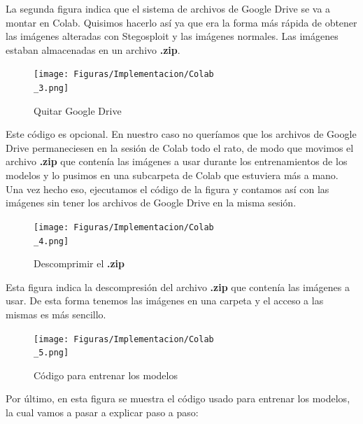 La segunda figura indica que el sistema de archivos de Google Drive se va a montar en Colab. Quisimos hacerlo así ya que era la forma más rápida de obtener las imágenes alteradas con Stegosploit y las imágenes normales. Las imágenes estaban almacenadas en un archivo \textbf{.zip}.

\begin{figure}[H]
  \centering
  \texttt{[image: Figuras/Implementacion/Colab\\\_3.png]}
  \label{fig:colab-3}
  \caption{Quitar Google Drive}
\end{figure}

Este código es opcional. En nuestro caso no queríamos que los archivos de Google Drive permaneciesen en la sesión de Colab todo el rato, de modo que movimos el archivo \textbf{.zip} que contenía las imágenes a usar durante los entrenamientos de los modelos y lo pusimos en una subcarpeta de Colab que estuviera más a mano. Una vez hecho eso, ejecutamos el código de la figura y contamos así con las imágenes sin tener los archivos de Google Drive en la misma sesión.

\begin{figure}[H]
  \centering
  \texttt{[image: Figuras/Implementacion/Colab\\\_4.png]}
  \label{fig:colab-4}
  \caption{Descomprimir el \textbf{.zip}}
\end{figure}

Esta figura indica la descompresión del archivo \textbf{.zip} que contenía las imágenes a usar. De esta forma tenemos las imágenes en una carpeta y el acceso a las mismas es más sencillo.

\begin{figure}[H]
  \centering
  \texttt{[image: Figuras/Implementacion/Colab\\\_5.png]}
  \label{fig:colab-5}
  \caption{Código para entrenar los modelos}
\end{figure}

Por último, en esta figura se muestra el código usado para entrenar los modelos, la cual vamos a pasar a explicar paso a paso:

